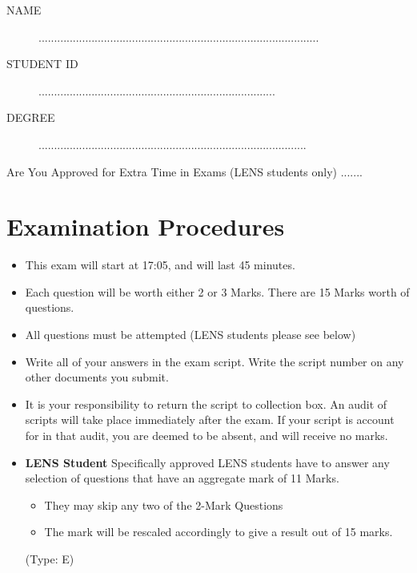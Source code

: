 \documentclass[11pt]{article} %
\begin{document}
	
	
	\Large
\newpage

\begin{framed}
\begin{description}
\item[NAME]  ..........................................................................................
\bigskip
\item[STUDENT ID] ............................................................................
\bigskip
\item[DEGREE] ......................................................................................
\end{description}
\end{framed}
\noindent Are You Approved for Extra Time in Exams (LENS students only)  .......
\section*{Examination Procedures}

\begin{itemize} 
	\item This exam will start at 17:05, and will last 45 minutes.
	
	\item Each question will be worth either 2 or 3 Marks. There are 15 Marks worth of questions.
	\item All questions must be attempted (LENS students please see below)
	
	\item Write all of your answers in the exam script. Write the script number on any other documents you submit.
	
	\item It is your responsibility to return the script to collection box. An audit of scripts will take place immediately after the exam. If your script is account for in that audit,  you are deemed to be absent, and will receive no marks.
	
	\item \textbf{LENS Student}
	Specifically approved LENS students have to answer any selection of questions that have an aggregate mark of 11 Marks.  
	\begin{itemize}
		\item They may skip any two of the 2-Mark Questions
		\item The mark will be rescaled accordingly to give a result out of 15 marks.
	\end{itemize}
(Type: E)		
	
\end{itemize}
\end{document}
